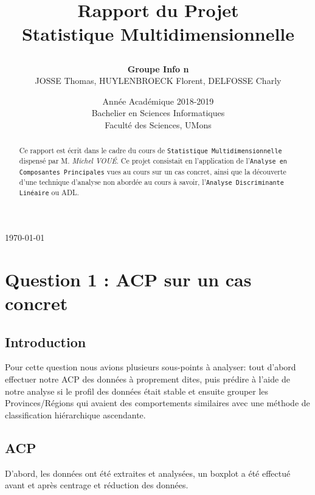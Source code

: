 \documentclass{article}
\begin{document}
\title{
{\Huge Rapport du Projet\\
Statistique Multidimensionnelle\\
\smallskip
\author{
\textbf{Groupe Info n}\\
JOSSE Thomas, HUYLENBROECK Florent, DELFOSSE Charly\\
}}
}
\date{Année Académique  2018-2019\\
 Bachelier en Sciences Informatiques
\\
\vspace{1cm}
Faculté des Sciences, UMons}



\maketitle            %
\bigskip
\begin{center} \today \end{center}
\begin{abstract}
Ce rapport est écrit dans le cadre du cours de \texttt{Statistique Multidimensionnelle} dispensé par M. \emph{Michel VOUÉ}. Ce projet consistait en l'application de l'\texttt{Analyse en Composantes Principales} vues au cours sur un cas concret, ainsi que la découverte d'une technique d'analyse non abordée au cours à savoir, l'\texttt{Analyse Discriminante Linéaire} ou ADL.
\end{abstract}
\newpage
\tableofcontents
\newpage
\section{Question 1 : ACP sur un cas concret}
\subsection{Introduction}
Pour cette question nous avions plusieurs sous-points à analyser: tout d'abord effectuer notre ACP des données à proprement dites, puis prédire à l'aide de notre analyse si le profil des données était stable et ensuite grouper les Provinces/Régions qui avaient des comportements similaires avec une méthode de classification hiérarchique ascendante. 

\subsection{ACP}
D'abord, les données ont été extraites et analysées, un boxplot a été effectué avant et après centrage et réduction des données.
\end{document}
